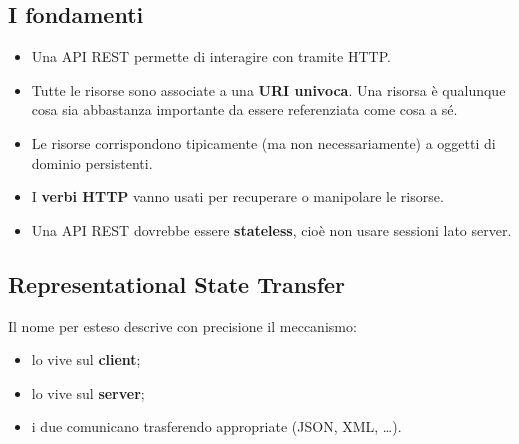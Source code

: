 \subsection{I fondamenti}

\begin{itemize}
  \item Una API REST permette di interagire con  tramite HTTP.
  \item Tutte le risorse sono associate a una \textbf{URI univoca}.
        \guillemotleft Una risorsa è qualunque cosa sia abbastanza importante da essere
        referenziata come cosa a sé\guillemotright.
  \item Le risorse corrispondono tipicamente (ma non necessariamente) a oggetti
        di dominio persistenti.
  \item I \textbf{verbi HTTP} vanno usati per recuperare o manipolare le
        risorse.
  \item Una API REST dovrebbe essere \textbf{stateless}, cioè non usare sessioni
        lato server.
\end{itemize}


\subsection{Representational State Transfer}

Il nome per esteso descrive con precisione il meccanismo:

\begin{itemize}
  \item lo  vive sul \textbf{client};
  \item lo  vive sul \textbf{server};
  \item i due comunicano trasferendo  appropriate (JSON,
        XML, \ldots).
\end{itemize}

